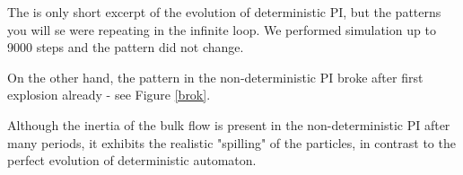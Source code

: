 The is only short excerpt of the evolution of deterministic PI, but the patterns you will se were repeating in the infinite loop. We performed simulation up to 9000 steps and the pattern did not change.

On the other hand, the pattern in the non-deterministic PI broke after first explosion already - see Figure \ref{brok}.

Although the inertia of the bulk flow is present in the non-deterministic PI after many periods,
it exhibits the realistic "spilling" of the particles, in contrast to the perfect evolution of deterministic automaton.

